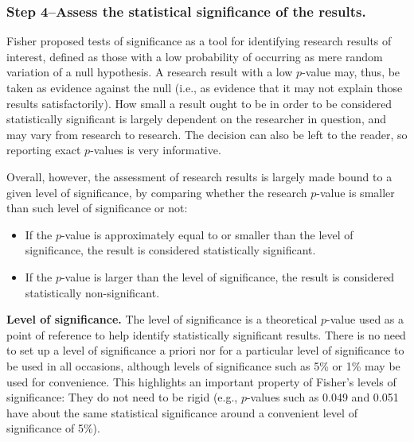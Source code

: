 \documentclass[
]{book}
\providecommand{\tightlist}{%
  \setlength{\itemsep}{0pt}\setlength{\parskip}{0pt}}
\theoremstyle{definition}
\theoremstyle{definition}
\theoremstyle{definition}
\theoremstyle{definition}
\theoremstyle{remark}
\begin{document}
\hypertarget{step-4assess-the-statistical-significance-of-the-results.}{%
\subsubsection*{Step 4--Assess the statistical significance of the results.}\label{step-4assess-the-statistical-significance-of-the-results.}}

Fisher proposed tests of significance as a tool for identifying research results of interest, defined as those with a low probability of occurring as mere random variation of a null hypothesis. A research result with a low \(p\)-value may, thus, be taken as evidence against the null (i.e., as evidence that it may not explain those results satisfactorily). How small a result ought to be in order to be considered statistically significant is largely dependent on the researcher in question, and may vary from research to research. The decision can also be left to the reader, so reporting exact \(p\)-values is very informative.

Overall, however, the assessment of research results is largely made bound to a given level of significance, by comparing whether the research \(p\)-value is smaller than such level of significance or not:

\begin{itemize}
\tightlist
\item
  If the \(p\)-value is approximately equal to or smaller than the level of significance, the result is considered statistically significant.
\item
  If the \(p\)-value is larger than the level of significance, the result is considered statistically non-significant.
\end{itemize}

\textbf{Level of significance.} The level of significance is a theoretical \(p\)-value used as a point of reference to help identify statistically significant results. There is no need to set up a level of significance a priori nor for a particular level of significance to be used in all occasions, although levels of significance such as 5\% or 1\% may be used for convenience. This highlights an important property of Fisher's levels of significance: They do not need to be rigid (e.g., \(p\)-values such as 0.049 and 0.051 have about the same statistical significance around a convenient level of significance of 5\%).
\end{document}
